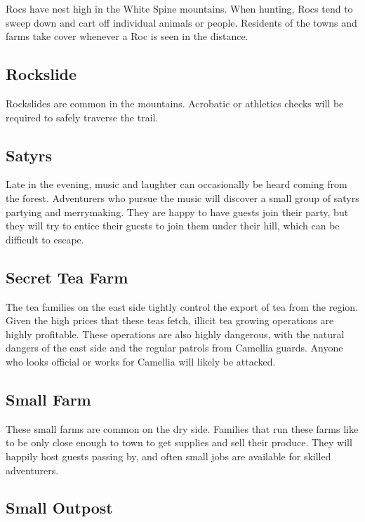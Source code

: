 Rocs have nest high in the White Spine mountains.
When hunting, Rocs tend to sweep down and cart off individual animals or people.
Residents of the towns and farms take cover whenever a Roc is seen in the distance.

\subsection{Rockslide}

Rockslides are common in the mountains.
Acrobatic or athletics checks will be required to safely traverse the trail.

\subsection{Satyrs}

Late in the evening, music and laughter can occasionally be heard coming from the forest.
Adventurers who pursue the music will discover a small group of satyrs partying and merrymaking.
They are happy to have guests join their party, but they will try to entice their guests to join them under their hill, which can be difficult to escape.

\subsection{Secret Tea Farm}

The tea families on the east side tightly control the export of tea from the region.
Given the high prices that these teas fetch, illicit tea growing operations are highly profitable.
These operations are also highly dangerous, with the natural dangers of the east side and the regular patrols from Camellia guards.
Anyone who looks official or works for Camellia will likely be attacked.

\subsection{Small Farm}

These small farms are common on the dry side.
Families that run these farms like to be only close enough to town to get supplies and sell their produce.
They will happily host guests passing by, and often small jobs are available for skilled adventurers.

\subsection{Small Outpost}

